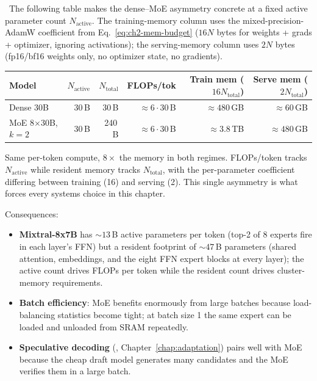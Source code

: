 \Ident\ The following table makes the dense--MoE asymmetry concrete
at a fixed active parameter count $N_{\mathrm{active}}$. The
training-memory column uses the mixed-precision-AdamW coefficient
from Eq.~\eqref{eq:ch2-mem-budget} ($16 N$ bytes for weights +
grads + optimizer, ignoring activations); the serving-memory column
uses $2 N$ bytes (fp16/bf16 weights only, no optimizer state, no
gradients).
\begin{center}
\begin{tabular}{|l|r|r|r|r|r|}
\hline
Model & $N_{\mathrm{active}}$ & $N_{\mathrm{total}}$ & FLOPs/tok & Train mem ($16N_{\mathrm{total}}$) & Serve mem ($2N_{\mathrm{total}}$) \\
\hline
Dense 30B           & 30\,B  & 30\,B   & $\approx 6 \cdot 30$\,B  & $\approx 480$\,GB & $\approx 60$\,GB \\
MoE 8$\times$30B, $k{=}2$ & 30\,B  & 240\,B  & $\approx 6 \cdot 30$\,B  & $\approx 3.8$\,TB & $\approx 480$\,GB \\
\hline
\end{tabular}
\end{center}
Same per-token compute, $8\times$ the memory in both regimes.
FLOPs/token tracks $N_{\mathrm{active}}$ while resident memory tracks
$N_{\mathrm{total}}$, with the per-parameter coefficient differing
between training (16) and serving (2). This single asymmetry is what
forces every systems choice in this chapter.

Consequences:
\begin{itemize}
  \item \textbf{Mixtral-8x7B} \citep{jiang2024mixtral} has
        $\sim\!13$\,B active parameters per token (top-2 of 8 experts
        fire in each layer's FFN) but a resident footprint of
        $\sim\!47$\,B parameters (shared attention, embeddings, and
        the eight FFN expert blocks at every layer); the active
        count drives FLOPs per token while the resident count drives
        cluster-memory requirements.
  \item \textbf{Batch efficiency}: MoE benefits enormously from large
        batches because load-balancing statistics become tight; at
        batch size 1 the same expert can be loaded and unloaded from
        SRAM repeatedly.
  \item \textbf{Speculative decoding} (\citealt{leviathan2023speculative},
        Chapter~\ref{chap:adaptation}) pairs well with MoE because the cheap draft model
        generates many candidates and the MoE verifies them in a
        large batch.
\end{itemize}

